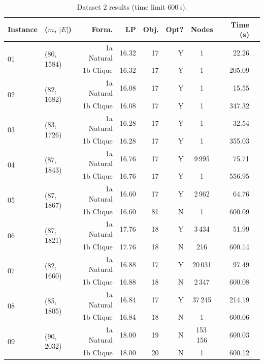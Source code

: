 \documentclass{article}
\begin{document}
\begin{table}[h]
\centering
\footnotesize
\caption{Dataset 2 results (time limit 600\,s).}
\label{tab:ds2}
\begin{tabular}{llrrrrcrr}
\toprule
Instance & ($m$, $\lvert E\rvert$) & Form. & LP & Obj. & Opt? & Nodes & Time (s) \\
\midrule
\multirow{2}{*}{01} & \multirow{2}{*}{(80, 1584)}
   & 1a Natural & 16.32 & 17 & Y & 1 &  22.26 \\
 & & 1b Clique  & 16.32 & 17 & Y & 1 & 205.09 \\
\midrule
\multirow{2}{*}{02} & \multirow{2}{*}{(82, 1682)}
   & 1a Natural & 16.08 & 17 & Y & 1 &  15.55 \\
 & & 1b Clique  & 16.08 & 17 & Y & 1 & 347.32 \\
\midrule
\multirow{2}{*}{03} & \multirow{2}{*}{(83, 1726)}
   & 1a Natural & 16.28 & 17 & Y & 1 &  32.54 \\
 & & 1b Clique  & 16.28 & 17 & Y & 1 & 355.03 \\
\midrule
\multirow{2}{*}{04} & \multirow{2}{*}{(87, 1843)}
   & 1a Natural & 16.76 & 17 & Y & 9\,995 &  75.71 \\
 & & 1b Clique  & 16.76 & 17 & Y & 1      & 556.95 \\
\midrule
\multirow{2}{*}{05} & \multirow{2}{*}{(87, 1867)}
   & 1a Natural & 16.60 & 17 & Y & 2\,962 &  64.76 \\
 & & 1b Clique  & 16.60 & 81 & N & 1      & 600.09 \\
\midrule
\multirow{2}{*}{06} & \multirow{2}{*}{(87, 1821)}
   & 1a Natural & 17.76 & 18 & Y & 3\,434 &  51.99 \\
 & & 1b Clique  & 17.76 & 18 & N & 216    & 600.14 \\
\midrule
\multirow{2}{*}{07} & \multirow{2}{*}{(82, 1660)}
   & 1a Natural & 16.88 & 17 & Y & 20\,031 &  97.49 \\
 & & 1b Clique  & 16.88 & 18 & N & 2\,347  & 600.08 \\
\midrule
\multirow{2}{*}{08} & \multirow{2}{*}{(85, 1805)}
   & 1a Natural & 16.84 & 17 & Y & 37\,245 & 214.19 \\
 & & 1b Clique  & 16.84 & 18 & N & 1       & 600.06 \\
\midrule
\multirow{2}{*}{09} & \multirow{2}{*}{(90, 2032)}
   & 1a Natural & 18.00 & 19 & N & 153\,156 & 600.03 \\
 & & 1b Clique  & 18.00 & 20 & N & 1        & 600.12 \\
\bottomrule
\end{tabular}
\end{table}
\end{document}
